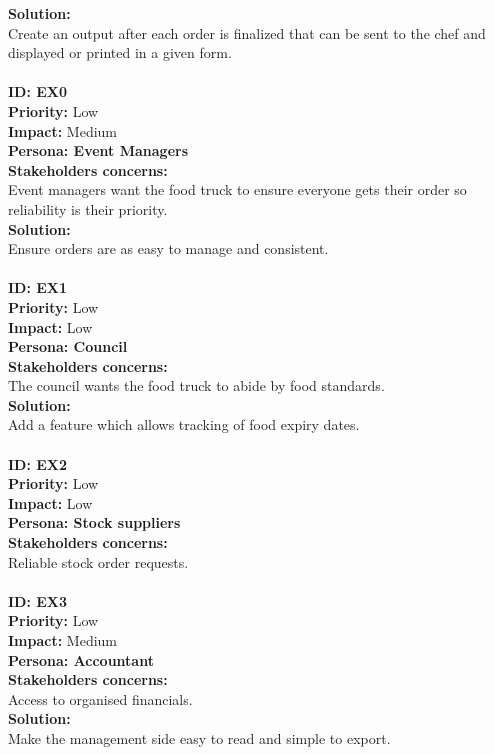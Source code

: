 \textbf{Solution:\\}
Create an output after each order is finalized that can be sent to the chef and displayed or printed in a given form.\\
\\
\textbf{ID: EX0}\\
\textbf{Priority:} Low\\
\textbf{Impact:} Medium\\
\textbf{Persona: Event Managers\\}
\textbf{Stakeholders concerns:\\}
Event managers want the food truck to ensure everyone gets their order so reliability is their priority.\\
\textbf{Solution:\\}
Ensure orders are as easy to manage and consistent.\\
\\
\textbf{ID: EX1}\\
\textbf{Priority:} Low\\
\textbf{Impact:} Low\\
\textbf{Persona: Council\\}
\textbf{Stakeholders concerns:\\}
The council wants the food truck to abide by food standards.\\
\textbf{Solution:\\}
Add a feature which allows tracking of food expiry dates.\\
\\
\textbf{ID: EX2}\\
\textbf{Priority:} Low\\
\textbf{Impact:} Low\\
\textbf{Persona: Stock suppliers\\}
\textbf{Stakeholders concerns:\\}
Reliable stock order requests.\\
\\
\textbf{ID: EX3}\\
\textbf{Priority:} Low\\
\textbf{Impact:} Medium\\
\textbf{Persona: Accountant\\}
\textbf{Stakeholders concerns:\\}
Access to organised financials.\\
\textbf{Solution:\\}
Make the management side easy to read and simple to export.\\
